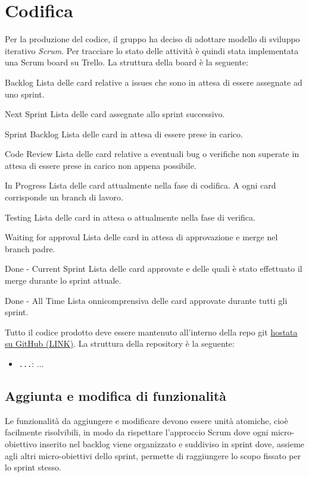 \section{Codifica}

Per la produzione del codice, il gruppo ha deciso di adottare modello di sviluppo iterativo \textit{Scrum}. Per tracciare lo stato delle attività è quindi stata implementata una Scrum board su Trello.
La struttura della board è la seguente:
\begin{itemdescript}
    \item [Backlog] Lista delle card relative a issues che sono in attesa di essere assegnate ad uno sprint.
    \item [Next Sprint] Lista delle card assegnate allo sprint successivo. 
    \item [Sprint Backlog] Lista delle card in attesa di essere prese in carico.
    \item [Code Review] Lista delle card relative a eventuali bug o verifiche non superate in attesa di essere prese in carico non appena possibile.
    \item [In Progress] Lista delle card attualmente nella fase di codifica. A ogni card corrisponde un branch di lavoro.
    \item [Testing] Lista delle card in attesa o attualmente nella fase di verifica.
    \item [Waiting for approval] Lista delle card in attesa di approvazione e merge nel branch padre.
    \item [Done - Current Sprint] Lista delle card approvate e delle quali è stato effettuato il merge durante lo sprint attuale.
    \item [Done - All Time] Lista onnicomprensiva delle card approvate durante tutti gli sprint.
\end{itemdescript}
Tutto il codice prodotto deve essere mantenuto all'interno della repo git \href{}{hostata su GitHub (LINK)}.
La struttura della repository è la seguente:
\begin{itemize}
    \item \texttt{...}: ...
\end{itemize}

\subsection{Aggiunta e modifica di funzionalità}
Le funzionalità da aggiungere e modificare devono essere unità atomiche, cioè facilmente risolvibili, in modo da rispettare l'approccio Scrum dove ogni micro-obiettivo inserito nel backlog viene organizzato e suddiviso in sprint dove, assieme agli altri micro-obiettivi dello sprint, permette di raggiungere lo scopo fissato per lo sprint stesso.

